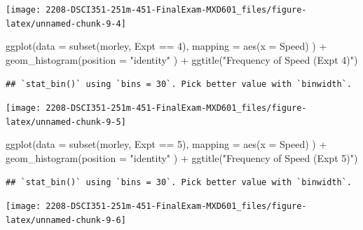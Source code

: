\documentclass[
]{article}
\newenvironment{Shaded}{\begin{snugshade}}{\end{snugshade}}
\newcommand{\AttributeTok}[1]{\textcolor[rgb]{0.77,0.63,0.00}{#1}}
\newcommand{\DecValTok}[1]{\textcolor[rgb]{0.00,0.00,0.81}{#1}}
\newcommand{\FunctionTok}[1]{\textcolor[rgb]{0.00,0.00,0.00}{#1}}
\newcommand{\NormalTok}[1]{#1}
\newcommand{\SpecialCharTok}[1]{\textcolor[rgb]{0.00,0.00,0.00}{#1}}
\newcommand{\StringTok}[1]{\textcolor[rgb]{0.31,0.60,0.02}{#1}}
\begin{document}
\begin{center}\texttt{[image: 2208-DSCI351-251m-451-FinalExam-MXD601\_files/figure-latex/unnamed-chunk-9-4]} \end{center}

\begin{Shaded}
\begin{Highlighting}[]
\FunctionTok{ggplot}\NormalTok{(}\AttributeTok{data =} \FunctionTok{subset}\NormalTok{(morley, Expt }\SpecialCharTok{==} \DecValTok{4}\NormalTok{),}
       \AttributeTok{mapping =} \FunctionTok{aes}\NormalTok{(}\AttributeTok{x =}\NormalTok{ Speed)}
\NormalTok{       ) }\SpecialCharTok{+} \FunctionTok{geom\_histogram}\NormalTok{(}\AttributeTok{position =} \StringTok{"identity"}
\NormalTok{       ) }\SpecialCharTok{+} \FunctionTok{ggtitle}\NormalTok{(}\StringTok{"Frequency of Speed (Expt 4)"}\NormalTok{)}
\end{Highlighting}
\end{Shaded}

\begin{verbatim}
## `stat_bin()` using `bins = 30`. Pick better value with `binwidth`.
\end{verbatim}

\begin{center}\texttt{[image: 2208-DSCI351-251m-451-FinalExam-MXD601\_files/figure-latex/unnamed-chunk-9-5]} \end{center}

\begin{Shaded}
\begin{Highlighting}[]
\FunctionTok{ggplot}\NormalTok{(}\AttributeTok{data =} \FunctionTok{subset}\NormalTok{(morley, Expt }\SpecialCharTok{==} \DecValTok{5}\NormalTok{),}
       \AttributeTok{mapping =} \FunctionTok{aes}\NormalTok{(}\AttributeTok{x =}\NormalTok{ Speed)}
\NormalTok{       ) }\SpecialCharTok{+} \FunctionTok{geom\_histogram}\NormalTok{(}\AttributeTok{position =} \StringTok{"identity"}
\NormalTok{       ) }\SpecialCharTok{+} \FunctionTok{ggtitle}\NormalTok{(}\StringTok{"Frequency of Speed (Expt 5)"}\NormalTok{)}
\end{Highlighting}
\end{Shaded}

\begin{verbatim}
## `stat_bin()` using `bins = 30`. Pick better value with `binwidth`.
\end{verbatim}

\begin{center}\texttt{[image: 2208-DSCI351-251m-451-FinalExam-MXD601\_files/figure-latex/unnamed-chunk-9-6]} \end{center}
\end{document}
